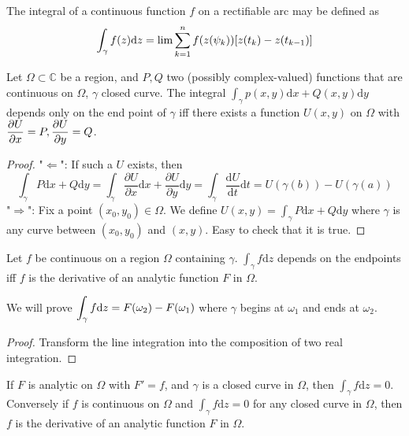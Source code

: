 The integral of a continuous function  $ f $ on a rectifiable arc may be defined as 
\[\displaystyle\int_\gamma f(z)\mathrm{d}z=\lim \sum_{k=1}^nf(z(\psi_k))[z(t_k)-z(t_{k-1})]\] 
\begin{theorem}
    Let  $ \Omega\subset \mathbb{C} $ be a region, and  $ P,Q $ two (possibly complex-valued) functions that are continuous on  $ \Omega $,  $ \gamma $ closed curve. The integral  $ \int_\gamma p(x,y)\mathrm{d}x+Q(x,y)\mathrm{d}y $ depends only on the end point of  $ \gamma $ iff there exists a function   $ U(x,y) $ on  $ \Omega $ with  $ \displaystyle\frac{\partial U}{\partial x}=P,\frac{\partial U}{\partial y}=Q $.  
\end{theorem}
\begin{proof}
    "$ \Leftarrow $": If such a  $ U $ exists, then 
    \[\int_\gamma P\mathrm{d}x+Q\mathrm{d}y=\int_\gamma\frac{\partial U}{\partial x}\mathrm{d}x+\frac{\partial U}{\partial y}\mathrm{d}y=\int_\gamma\frac{\mathrm{d}U}{\mathrm{d}t}\mathrm{d}t=U(\gamma(b))-U(\gamma(a))\] 
    "$ \Rightarrow $": Fix a point  $ (x_0,y_0)\in \Omega $. We define  $ U(x,y)=\int_\gamma P\mathrm{d}x+Q\mathrm{d}y$ where  $ \gamma $ is any curve between  $ (x_0,y_0) $ and  $ (x,y) $. Easy to check that it is true.     
\end{proof}
\begin{theorem}\label{FTC for integrals}
    Let  $ f $ be continuous on a region  $ \Omega $  containing  $ \gamma $.  $ \int_\gamma f\mathrm{d}z $ depends on the endpoints iff  $ f $ is the derivative of an analytic function  $ F $ in  $ \Omega $.     
\end{theorem}
\begin{remark}
    We will prove  $ \displaystyle\int_\gamma f\mathrm{d}z=F(\omega_2)-F(\omega_1) $ where  $ \gamma $ begins at  $ \omega_1 $ and ends at  $ \omega_2 $.    
\end{remark}
\begin{proof}
    Transform  the line integration into  the composition of two real integration.
\end{proof}
\begin{corollary}\label{Corollary of Fundamental Theorem}
    If  $ F $ is analytic on  $ \Omega $ with  $ F'=f $, and  $ \gamma $ is a closed curve in  $\Omega $, then  $ \int_\gamma f\mathrm{d}z=0 $. Conversely if  $ f $  is continuous on  $ \Omega $ and  $ \int_\gamma f\mathrm{d}z=0 $ for any closed curve in  $ \Omega $, then  $ f $ is the derivative of an analytic function  $ F $ in  $\Omega $.          
\end{corollary}

